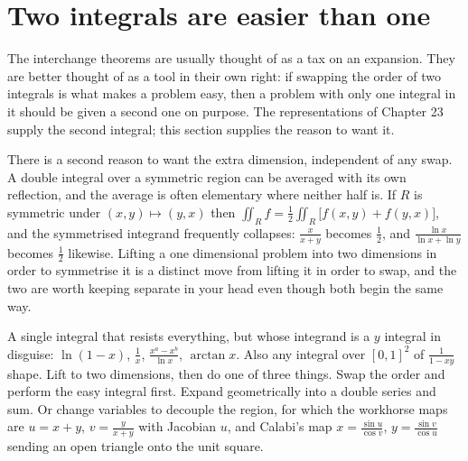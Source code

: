 \section{Two integrals are easier than one}

The interchange theorems are usually thought of as a tax on an expansion. They are better thought of as a tool in their own right: if swapping the order of two integrals is what makes a problem easy, then a problem with only one integral in it should be given a second one on purpose. The representations of Chapter 23 supply the second integral; this section supplies the reason to want it.

There is a second reason to want the extra dimension, independent of any swap. A double integral over a symmetric region can be averaged with its own reflection, and the average is often elementary where neither half is. If $R$ is symmetric under $(x,y)\mapsto(y,x)$ then $\iint_R f=\tfrac12\iint_R\bigl[f(x,y)+f(y,x)\bigr]$, and the symmetrised integrand frequently collapses: $\frac{x}{x+y}$ becomes $\tfrac12$, and $\frac{\ln x}{\ln x+\ln y}$ becomes $\tfrac12$ likewise. Lifting a one dimensional problem into two dimensions in order to symmetrise it is a distinct move from lifting it in order to swap, and the two are worth keeping separate in your head even though both begin the same way.

\cue A single integral that resists everything, but whose integrand is a $y$ integral in disguise: $\ln(1-x)$, $\tfrac1x$, $\tfrac{x^{a}-x^{b}}{\ln x}$, $\arctan x$. Also any integral over $[0,1]^{2}$ of $\tfrac{1}{1-xy}$ shape.
\method Lift to two dimensions, then do one of three things. Swap the order and perform the easy integral first. Expand geometrically into a double series and sum. Or change variables to decouple the region, for which the workhorse maps are $u=x+y$, $v=\tfrac{y}{x+y}$ with Jacobian $u$, and Calabi's map $x=\tfrac{\sin u}{\cos v}$, $y=\tfrac{\sin v}{\cos u}$ sending an open triangle onto the unit square.

